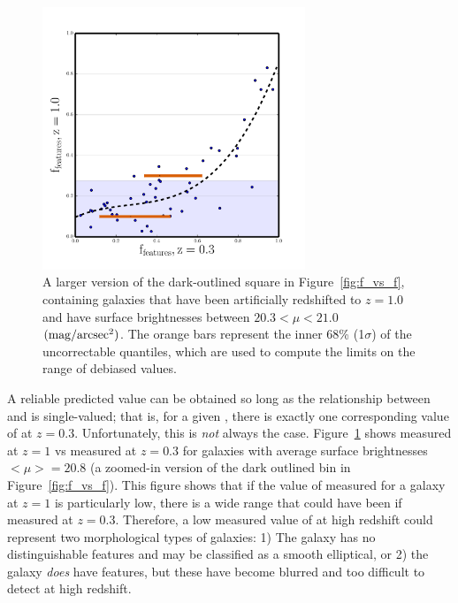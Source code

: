 \begin{figure}
\centering
\includegraphics[width=0.7\textwidth]{figures/z1_mu20_subplot2.pdf}
\caption{A larger version of the dark-outlined square in Figure~\ref{fig:f_vs_f}, containing
\ferengi{} galaxies that have been artificially redshifted to $z=1.0$ and have
surface brightnesses between $20.3 < \mu < 21.0$ $\rm (mag/arcsec^2)$. The orange bars represent the inner
68\% (1$\sigma$) of the uncorrectable \ffeatures{} quantiles, which are used
to compute the limits on the range of debiased values.}
\label{fig:f_vs_f_zoom}
\end{figure}

A reliable predicted value can be obtained so long as
the relationship between \ffeaturesz{} and \ffeaturesrest{} is single-valued;
that is, for a given \ffeaturesz, there is exactly one corresponding value of
\ffeatures{} at $z=0.3$. Unfortunately, this is \emph{not} always the case. Figure~\ref{fig:f_vs_f_zoom} shows \ffeatures{} measured at $z=1$ vs \ffeatures{} measured at $z=0.3$ for \ferengi{} galaxies with average surface brightnesses $<\mu>=20.8$ (a zoomed-in version of the dark outlined bin in Figure~\ref{fig:f_vs_f}). This figure shows that if the value of \ffeatures{} measured for a galaxy at $z=1$ is particularly low, there is a wide range that \ffeatures{} could have been if measured at $z=0.3$. Therefore, a low measured value of \ffeatures{} at high redshift could represent two morphological types of galaxies: 1) The galaxy has no distinguishable features and may be classified as a smooth elliptical, or 2) the galaxy \emph{does} have features, but these have become blurred and too difficult to detect at high redshift. 

